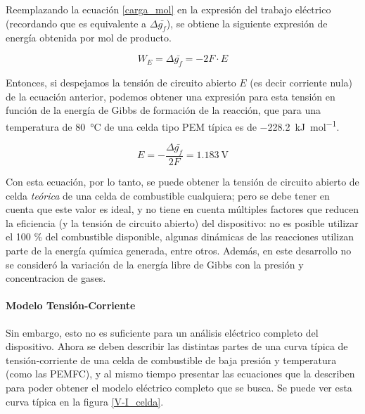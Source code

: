 Reemplazando la ecuación \ref{carga_mol} en la expresión del trabajo eléctrico (recordando que es equivalente a $\Delta\bar{g_f}$), se obtiene la siguiente expresión de energía obtenida por mol de producto.

\begin{equation}\label{trabajo_elec}
    W_E=\Delta\bar{g_f}=-2F\cdot E
\end{equation}

Entonces, si despejamos la tensión de circuito abierto $E$ (es decir corriente nula) de la ecuación anterior, podemos obtener una expresión para esta tensión en función de la energía de Gibbs de formación de la reacción, que para una temperatura de \SI{80}{\celsius} de una celda tipo PEM típica es de \SI{-228.2}{\kilo\joule\per\mole}.\textsuperscript{\cite{FCSysExplained}}

\begin{equation}\label{tension_vacio}
    \boxed{E=-\frac{\Delta\bar{g_f}}{2F}=\SI{1.183}{\volt}}
\end{equation}

Con esta ecuación, por lo tanto, se puede obtener la {\Medium tensión de circuito abierto de celda} \textit{teórica} de una celda de combustible cualquiera; pero se debe tener en cuenta que este valor es ideal, y no tiene en cuenta múltiples factores que reducen la eficiencia (y la tensión de circuito abierto) del dispositivo: no es posible utilizar el 100 \% del combustible disponible, algunas dinámicas de las reacciones utilizan parte de la energía química generada, entre otros. Además, en este desarrollo no se consideró la variación de la energía libre de Gibbs con la presión y concentracion de gases.\\

\paragraph{Modelo Tensión-Corriente}

Sin embargo, esto no es suficiente para un análisis eléctrico completo del dispositivo. Ahora se deben describir las distintas partes de una curva típica de tensión-corriente de una celda de combustible de baja presión y temperatura (como las PEMFC), y al mismo tiempo presentar las ecuaciones que la describen para poder obtener el modelo eléctrico completo que se busca. Se puede ver esta curva típica en la figura \ref{V-I_celda}.\\

